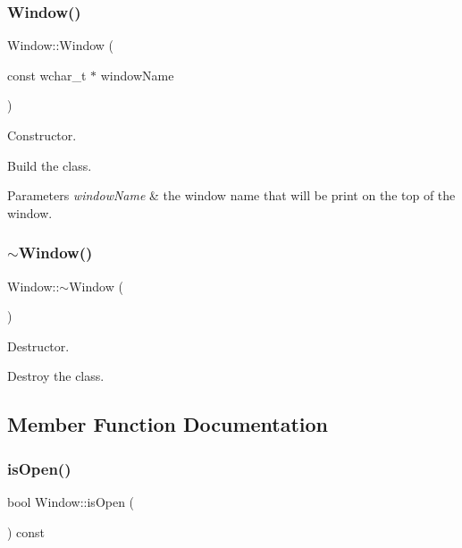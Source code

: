 \subsubsection{\texorpdfstring{Window()}{Window()}}
{\footnotesize\ttfamily Window\+::\+Window (\begin{DoxyParamCaption}\item[{const wchar\+\_\+t $\ast$}]{window\+Name }\end{DoxyParamCaption})}



Constructor. 

Build the class.


\begin{DoxyParams}{Parameters}
{\em \textquotesingle{}window\+Name\textquotesingle{}} & the window name that will be print on the top of the window. \\
\hline
\end{DoxyParams}
\mbox{\label{classWindow_a245d821e6016fa1f6970ccbbedd635f6}} 
\subsubsection{\texorpdfstring{$\sim$\+Window()}{~Window()}}
{\footnotesize\ttfamily Window\+::$\sim$\+Window (\begin{DoxyParamCaption}{ }\end{DoxyParamCaption})}



Destructor. 

Destroy the class. 

\subsection{Member Function Documentation}
\mbox{\label{classWindow_a761d614931fb5a5daa70e4f580c3e78e}} 
\subsubsection{\texorpdfstring{is\+Open()}{isOpen()}}
{\footnotesize\ttfamily bool Window\+::is\+Open (\begin{DoxyParamCaption}{ }\end{DoxyParamCaption}) const}



